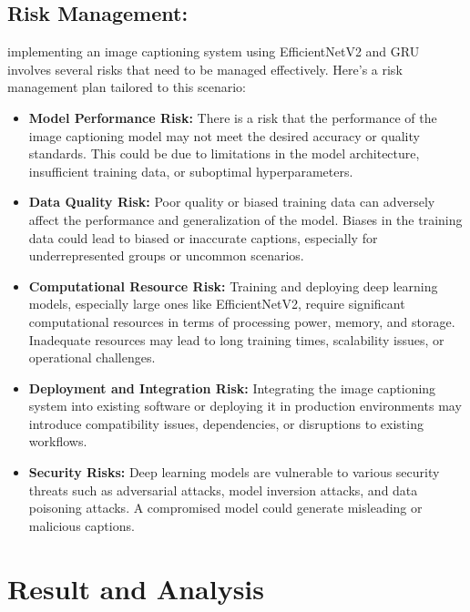 \documentclass[oneside,a4paper,12pt]{report}
\begin{document}
\section{Risk Management:}
implementing an image captioning system using EfficientNetV2 and GRU involves several risks that need to be managed effectively. Here's a risk management plan tailored to this scenario:
\begin{itemize}
\item{\textbf{Model Performance Risk:} }There is a risk that the performance of the image captioning model may not meet the desired accuracy or quality standards. This could be due to limitations in the model architecture, insufficient training data, or suboptimal hyperparameters.
\item{\textbf{Data Quality Risk:} }Poor quality or biased training data can adversely affect the performance and generalization of the model. Biases in the training data could lead to biased or inaccurate captions, especially for underrepresented groups or uncommon scenarios.
\item{\textbf{Computational Resource Risk:} }Training and deploying deep learning models, especially large ones like EfficientNetV2, require significant computational resources in terms of processing power, memory, and storage. Inadequate resources may lead to long training times, scalability issues, or operational challenges.
\item{\textbf{Deployment and Integration Risk:} }Integrating the image captioning system into existing software or deploying it in production environments may introduce compatibility issues, dependencies, or disruptions to existing workflows.
\item{\textbf{Security Risks: }}Deep learning models are vulnerable to various security threats such as adversarial attacks, model inversion attacks, and data poisoning attacks. A compromised model could generate misleading or malicious captions.

\end{itemize}
\chapter{Result and Analysis}
\end{document}
